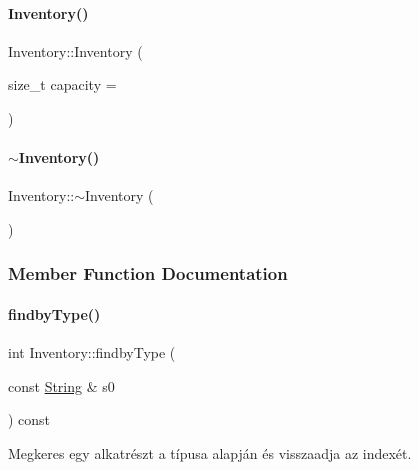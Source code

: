\paragraph{\texorpdfstring{Inventory()}{Inventory()}}
{\footnotesize\ttfamily Inventory\+::\+Inventory (\begin{DoxyParamCaption}\item[{size\+\_\+t}]{capacity = {} }\end{DoxyParamCaption})\hspace{0.3cm}{\ttfamily [inline]}}

\mbox{\label{class_inventory_a6c6dfcb6d977c74a7abf46809e892e3d}} 
\paragraph{\texorpdfstring{$\sim$Inventory()}{~Inventory()}}
{\footnotesize\ttfamily Inventory\+::$\sim$\+Inventory (\begin{DoxyParamCaption}{ }\end{DoxyParamCaption})\hspace{0.3cm}{\ttfamily [inline]}}



\subsubsection{Member Function Documentation}
\mbox{\label{class_inventory_a2a5998334229d148aac3e0dc16642480}} 
\paragraph{\texorpdfstring{findbyType()}{findbyType()}}
{\footnotesize\ttfamily int Inventory\+::findby\+Type (\begin{DoxyParamCaption}\item[{const \mbox{\hyperlink{class_string}{String}} \&}]{s0 }\end{DoxyParamCaption}) const}



Megkeres egy alkatrészt a típusa alapján és visszaadja az indexét. 

\mbox{\label{class_inventory_a3ccacc9422b01b2c17836ca804bcaafc}} 
